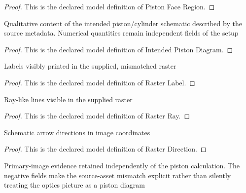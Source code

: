 \begin{proof}
  This is the declared model definition of Piston Face Region.
\end{proof}
\begin{definition}
  \label{def:physics:phyx-mini-0662:phyxminiproblems-problemphyxmini0662-intendedpistondiagram}
  Qualitative content of the intended piston/cylinder schematic described by the source metadata. Numerical quantities remain independent fields of the setup
\end{definition}
\begin{proof}
  This is the declared model definition of Intended Piston Diagram.
\end{proof}
\begin{definition}
  \label{def:physics:phyx-mini-0662:phyxminiproblems-problemphyxmini0662-rasterlabel}
  Labels visibly printed in the supplied, mismatched raster
\end{definition}
\begin{proof}
  This is the declared model definition of Raster Label.
\end{proof}
\begin{definition}
  \label{def:physics:phyx-mini-0662:phyxminiproblems-problemphyxmini0662-rasterray}
  Ray-like lines visible in the supplied raster
\end{definition}
\begin{proof}
  This is the declared model definition of Raster Ray.
\end{proof}
\begin{definition}
  \label{def:physics:phyx-mini-0662:phyxminiproblems-problemphyxmini0662-rasterdirection}
  Schematic arrow directions in image coordinates
\end{definition}
\begin{proof}
  This is the declared model definition of Raster Direction.
\end{proof}
\begin{definition}
  \label{def:physics:phyx-mini-0662:phyxminiproblems-problemphyxmini0662-suppliedopticsraster}
  Primary-image evidence retained independently of the piston calculation. The negative fields make the source-asset mismatch explicit rather than silently treating the optics picture as a piston diagram
\end{definition}
